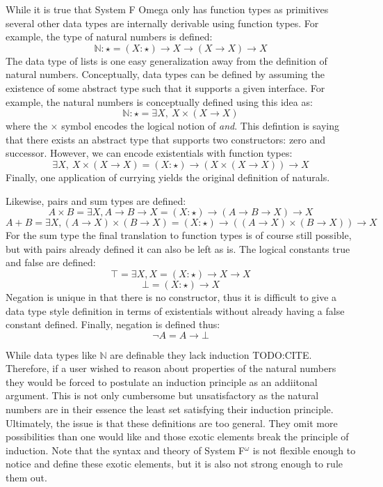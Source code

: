 While it is true that System F Omega only has function types as primitives several other data types are internally derivable using function types.
For example, the type of natural numbers is defined:
$$\mathbb{N} : \star = (X : \star) \to X \to (X \to X) \to X$$
The data type of lists is one easy generalization away from the definition of natural numbers.
Conceptually, data types can be defined by assuming the existence of some abstract type such that it supports a given interface.
For example, the natural numbers is conceptually defined using this idea as:
$$\mathbb{N} : \star = \exists X,\ X \times (X \to X)$$
where the $\times$ symbol encodes the logical notion of \textit{and}.
This defintion is saying that there exists an abstract type that supports two constructors: zero and successor.
However, we can encode existentials with function types:
$$\exists X,\ X \times (X \to X) = (X : \star) \to (X \times (X \to X)) \to X$$
Finally, one application of currying yields the original definition of naturals.

Likewise, pairs and sum types are defined:
$$A \times B = \exists X, A \to B \to X = (X : \star) \to (A \to B \to X) \to X$$
$$A + B = \exists X, (A \to X) \times (B \to X) = (X : \star) \to ((A \to X) \times (B \to X)) \to X$$
For the sum type the final translation to function types is of course still possible, but with pairs already defined it can also be left as is.
The logical constants true and false are defined:
$$\top = \exists X, X = (X : \star) \to X \to X$$
$$\bot = (X : \star) \to X$$
Negation is unique in that there is no constructor, thus it is difficult to give a data type style definition in terms of existentials without already having a false constant defined.
Finally, negation is defined thus:
$$\neg A = A \to \bot$$

While data types like $\mathbb{N}$ are definable they lack induction TODO:CITE.
Therefore, if a user wished to reason about properties of the natural numbers they would be forced to postulate an induction principle as an addiitonal argument.
This is not only cumbersome but unsatisfactory as the natural numbers are in their essence the least set satisfying their induction principle.
Ultimately, the issue is that these definitions are too general.
They omit more possibilities than one would like and those exotic elements break the principle of induction.
Note that the syntax and theory of System F$^\omega$ is not flexible enough to notice and define these exotic elements, but it is also not strong enough to rule them out.

